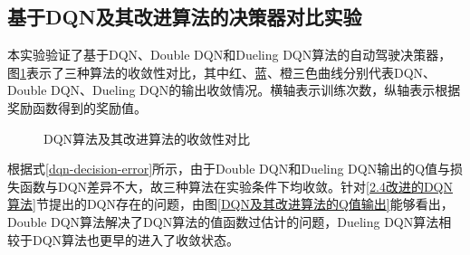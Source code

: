 \subsection{基于DQN及其改进算法的决策器对比实验}

本实验验证了基于DQN、Double DQN和Dueling DQN算法的自动驾驶决策器，图\ref{DQN算法及其改进算法的收敛性对比}表示了三种算法的收敛性对比，其中红、蓝、橙三色曲线分别代表DQN、Double DQN、Dueling DQN的输出收敛情况。横轴表示训练次数，纵轴表示根据奖励函数得到的奖励值。

\begin{figure}[htbp]
    \vspace{13pt}
    \centering
    \caption{DQN算法及其改进算法的收敛性对比}\label{DQN算法及其改进算法的收敛性对比} 
\end{figure}

根据式\ref{dqn-decision-error}所示，由于Double DQN和Dueling DQN输出的Q值与损失函数与DQN差异不大，故三种算法在实验条件下均收敛。针对\ref{2.4改进的DQN算法}节提出的DQN存在的问题，由图\ref{DQN及其改进算法的Q值输出}能够看出，Double DQN算法解决了DQN算法的值函数过估计的问题，Dueling DQN算法相较于DQN算法也更早的进入了收敛状态。

